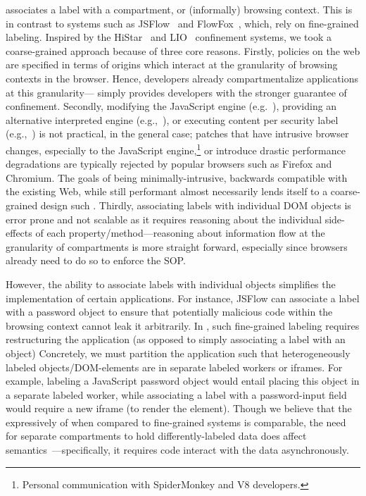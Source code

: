 \sys{} associates a label with a compartment, or (informally) browsing
context.
%
This is in contrast to systems such as JSFlow~\cite{Hedin:2012} and
FlowFox~\cite{DeGroef:2012}, which, rely on fine-grained labeling.
%
Inspired by the HiStar~ and
LIO~ confinement systems, we took a coarse-grained
approach because of three core reasons.
%
Firstly, policies on the web are specified in terms of origins which
interact at the granularity of browsing contexts in the browser.
%
Hence, developers already compartmentalize applications at this
granularity---\sys{} simply provides developers with the stronger
guarantee of confinement.
%
Secondly, modifying the JavaScript engine (e.g.~),
providing an alternative interpreted engine (e.g.,~\cite{Hedin:2012}),
or executing content per security label (e.g.,~\cite{DeGroef:2012}) is
not practical, in the general case;
patches that have intrusive browser changes, especially to the
JavaScript engine,\footnote{
  Personal communication with SpiderMonkey and V8 developers.
} or introduce drastic performance degradations are typically rejected
by popular browsers such as Firefox and Chromium.
%
The goals of being minimally-intrusive, backwards compatible with the
existing Web, while still performant almost necessarily lends itself
to a coarse-grained design such \sys{}.
%
Thirdly, associating labels with individual DOM objects is error
prone and not scalable as it requires reasoning about the individual
side-effects of each property/method---reasoning about information
flow at the granularity of compartments is more straight forward,
especially since browsers already need to do so to enforce the SOP.


However, the ability to associate labels with individual objects
simplifies the implementation of certain applications. 
%
For instance, JSFlow can associate a label with a password object
to ensure that potentially malicious code within the browsing context
cannot leak it arbitrarily.
%
In \sys{}, such fine-grained labeling requires restructuring the
application (as opposed to simply associating a label with an object)
%
Concretely, we must partition the application such that
heterogeneously labeled objects/DOM-elements are in separate labeled
workers or iframes.
%
For example, labeling a JavaScript password object would entail
placing this object in a separate labeled worker, while associating a
label with a password-input field would require a new iframe (to
render the element).
%
Though we believe that the expressively of \sys{} when compared to
fine-grained systems is comparable, the need for separate compartments
to hold differently-labeled data does affect
semantics~\cite{Ingram:2012}---specifically, it requires code interact
with the data asynchronously.



